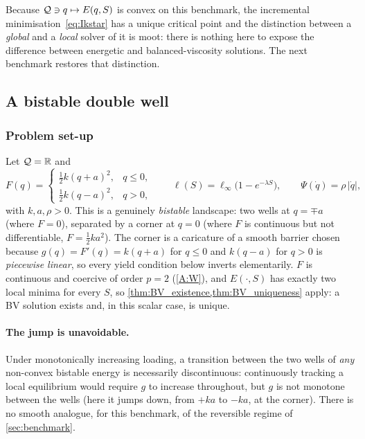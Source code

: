 Because $\mathcal{Q}\ni q\mapsto E(q,S)$ is convex on this benchmark, the
incremental minimisation~\eqref{eq:Ikstar} has a unique critical point
and the distinction between a \emph{global} and a \emph{local} solver
of it is moot: there is nothing here to expose the difference between
energetic and balanced-viscosity solutions. The next benchmark restores
that distinction.

\subsection{A bistable double well}\label{sec:benchmark2}

\subsubsection{Problem set-up} \label{sec:setup}

Let $\mathcal{Q}=\mathbb{R}$ and
\begin{equation}\label{eq:benchmark2}
  F(q)=
  \begin{cases}
    \tfrac12 k(q+a)^2, & q\le0,\\
    \tfrac12 k(q-a)^2, & q>0,
  \end{cases}
  \qquad
  \ell(S)=\ell_\infty\bigl(1-e^{-\lambda S}\bigr),
  \qquad
  \Psi(\dot q)=\rho\,|\dot q|,
\end{equation}
with $k,a,\rho>0$. This is a genuinely \emph{bistable} landscape: two
wells at $q=\mp a$ (where $F=0$), separated by a corner at $q=0$ (where
$F$ is continuous but not differentiable, $F=\tfrac12ka^2$). The
corner is a caricature of a smooth barrier chosen because $g(q)=F'(q)=k(q+a)$ for $q\le0$ and
$k(q-a)$ for $q>0$ is \emph{piecewise linear}, so every yield condition
below inverts elementarily. $F$ is
continuous and coercive of order $p=2$ (\ref{A:W}), and $E(\cdot,S)$
has exactly two local minima for every $S$, so
\cref{thm:BV_existence,thm:BV_uniqueness} apply: a BV solution exists
and, in this scalar case, is unique.

\paragraph{The jump is unavoidable.} Under monotonically increasing
loading, a transition between the two wells of \emph{any} non-convex
bistable energy is necessarily discontinuous: continuously tracking a
local equilibrium would require $g$ to increase throughout, but $g$
is not monotone between the wells (here it jumps down, from $+ka$ to
$-ka$, at the corner). There is no smooth analogue, for this benchmark,
of the reversible regime of \cref{sec:benchmark}.

